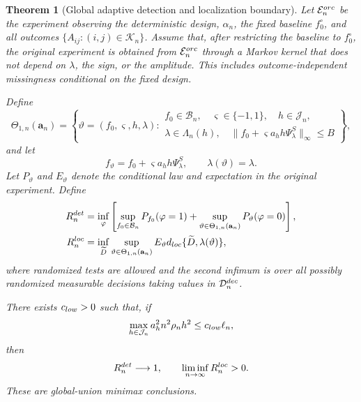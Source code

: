 \documentclass[10pt,a4paper]{amsart}
\newtheorem{theorem}{Theorem}
\begin{document}
\begin{theorem}[Global adaptive detection and localization boundary]
Let \(\mathcal E_n^{\rm orc}\) be the experiment observing the
deterministic design, \(\alpha_n\), the fixed baseline
\(f_0^\circ\), and all outcomes
\(\{A_{ij}:(i,j)\in\mathcal K_n\}\).  Assume that, after restricting
the baseline to \(f_0^\circ\), the original experiment is obtained
from \(\mathcal E_n^{\rm orc}\) through a Markov kernel that does not
depend on \(\lambda\), the sign, or the amplitude.  This includes
outcome-independent missingness conditional on the fixed design.

Define
\[
\Theta_{1,n}(\mathbf a_n)
=
\left\{
\vartheta=(f_0,\varsigma,h,\lambda):
\begin{array}{l}
f_0\in\mathcal B_n,\quad
\varsigma\in\{-1,1\},\quad
h\in\mathcal J_n,\\
\lambda\in\Lambda_n(h),\quad
\|f_0+\varsigma a_h h\Psi_\lambda^S\|_\infty\le B
\end{array}
\right\},
\]
and let
\[
f_\vartheta
=
f_0+\varsigma a_h h\Psi_\lambda^S,
\qquad
\lambda(\vartheta)=\lambda.
\]
Let \(P_\vartheta\) and \(E_\vartheta\) denote the conditional law and
expectation in the original experiment.  Define
\begin{align}
R_n^{\rm det}
&=
\inf_\varphi
\left[
\sup_{f_0\in\mathcal B_n}P_{f_0}(\varphi=1)
+
\sup_{\vartheta\in\Theta_{1,n}(\mathbf a_n)}
P_\vartheta(\varphi=0)
\right],
\label{eq:t3-24}\\
R_n^{\rm loc}
&=
\inf_{\widetilde D}
\sup_{\vartheta\in\Theta_{1,n}(\mathbf a_n)}
E_\vartheta
d_{\rm loc}\{\widetilde D,\lambda(\vartheta)\},
\label{eq:t3-25}
\end{align}
where randomized tests are allowed and the second infimum is over
all possibly randomized measurable decisions taking values in
\(\mathcal D_n^{\rm dec}\).

There exists \(c_{\rm low}>0\) such that, if
\begin{equation}
\max_{h\in\mathcal J_n}
a_h^2n^2\rho_nh^2
\le
c_{\rm low}\ell_n,
\label{eq:t3-26}
\end{equation}
then
\begin{equation}
R_n^{\rm det}\longrightarrow1,
\qquad
\liminf_{n\to\infty}R_n^{\rm loc}>0.
\label{eq:t3-27}
\end{equation}
These are global-union minimax conclusions.
\end{theorem}
\end{document}
